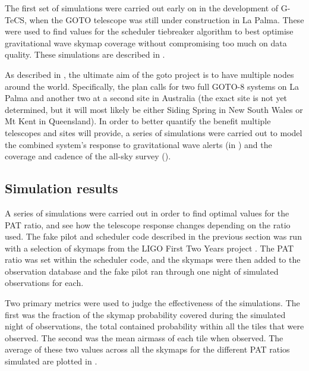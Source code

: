 \begin{colsection}
\begin{colsection}
The first set of simulations were carried out early on in the development of G-TeCS, when the GOTO telescope was still under construction in La Palma. These were used to find values for the scheduler tiebreaker algorithm to best optimise gravitational wave skymap coverage without compromising too much on data quality. These simulations are described in .

As described in , the ultimate aim of the \gls{goto} project is to have multiple nodes around the world. Specifically, the plan calls for two full GOTO-8 systems on La Palma and another two at a second site in Australia (the exact site is not yet determined, but it will most likely be either Siding Spring in New South Wales or Mt Kent in Queensland). In order to better quantify the benefit multiple telescopes and sites will provide, a series of simulations were carried out to model the combined system's response to gravitational wave alerts (in ) and the coverage and cadence of the all-sky survey ().

\end{colsection}


\subsection{Simulation results}
\label{sec:scheduler_sim_results}
\begin{colsection}

A series of simulations were carried out in order to find optimal values for the PAT ratio, and see how the telescope response changes depending on the ratio used. The fake pilot and scheduler code described in the previous section was run with a selection of skymaps from the LIGO First Two Years project \citep{First2Years}. The PAT ratio was set within the scheduler code, and the skymaps were then added to the observation database and the fake pilot ran through one night of simulated observations for each.

Two primary metrics were used to judge the effectiveness of the simulations. The first was the fraction of the skymap probability covered during the simulated night of observations, the total contained probability within all the tiles that were observed. The second was the mean airmass of each tile when observed. The average of these two values across all the skymaps for the different PAT ratios simulated are plotted in .


\end{colsection}
\end{colsection}
